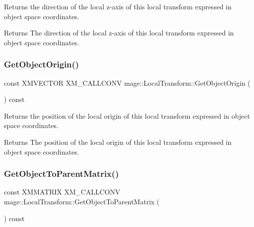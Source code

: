Returns the direction of the local z-\/axis of this local transform expressed in object space coordinates.

\begin{DoxyReturn}{Returns}
The direction of the local z-\/axis of this local transform expressed in object space coordinates. 
\end{DoxyReturn}
\mbox{\label{classmage_1_1_local_transform_abaa858e23864984b339b2fa26607c026}} 
\subsubsection{\texorpdfstring{Get\+Object\+Origin()}{GetObjectOrigin()}}
{\footnotesize\ttfamily const X\+M\+V\+E\+C\+T\+OR X\+M\+\_\+\+C\+A\+L\+L\+C\+O\+NV mage\+::\+Local\+Transform\+::\+Get\+Object\+Origin (\begin{DoxyParamCaption}{ }\end{DoxyParamCaption}) const\hspace{0.3cm}{\ttfamily [noexcept]}}

Returns the position of the local origin of this local transform expressed in object space coordinates.

\begin{DoxyReturn}{Returns}
The position of the local origin of this local transform expressed in object space coordinates. 
\end{DoxyReturn}
\mbox{\label{classmage_1_1_local_transform_aaf08dbe2fd5125b11e61fc052911dbb6}} 
\subsubsection{\texorpdfstring{Get\+Object\+To\+Parent\+Matrix()}{GetObjectToParentMatrix()}}
{\footnotesize\ttfamily const X\+M\+M\+A\+T\+R\+IX X\+M\+\_\+\+C\+A\+L\+L\+C\+O\+NV mage\+::\+Local\+Transform\+::\+Get\+Object\+To\+Parent\+Matrix (\begin{DoxyParamCaption}{ }\end{DoxyParamCaption}) const\hspace{0.3cm}{\ttfamily [noexcept]}}

